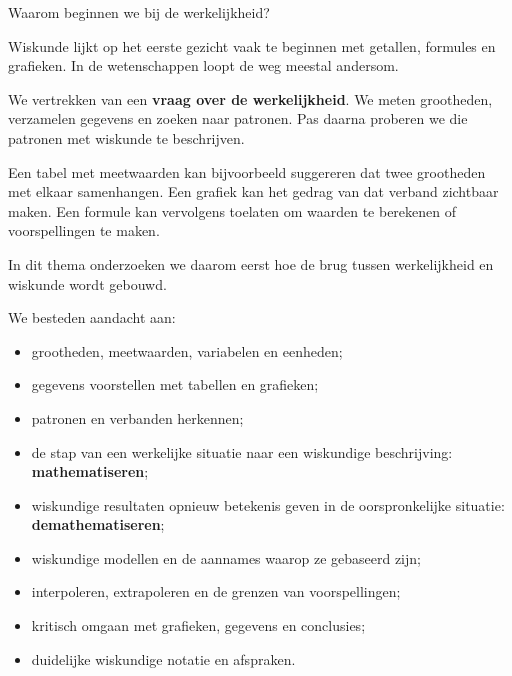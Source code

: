 \documentclass{xourse}
\begin{document}
\begin{themaintro}{Waarom beginnen we bij de werkelijkheid?}

  Wiskunde lijkt op het eerste gezicht vaak te beginnen met getallen,
  formules en grafieken. In de wetenschappen loopt de weg meestal
  andersom.

  We vertrekken van een \textbf{vraag over de werkelijkheid}.
  We meten grootheden, verzamelen gegevens en zoeken naar patronen.
  Pas daarna proberen we die patronen met wiskunde te beschrijven.

  Een tabel met meetwaarden kan bijvoorbeeld suggereren dat twee
  grootheden met elkaar samenhangen. Een grafiek kan het gedrag van
  dat verband zichtbaar maken. Een formule kan vervolgens toelaten
  om waarden te berekenen of voorspellingen te maken.

  In dit thema onderzoeken we daarom eerst hoe de brug tussen
  werkelijkheid en wiskunde wordt gebouwd.

  We besteden aandacht aan:

  \begin{itemize}

    \item grootheden, meetwaarden, variabelen en eenheden;

    \item gegevens voorstellen met tabellen en grafieken;

    \item patronen en verbanden herkennen;

    \item de stap van een werkelijke situatie naar een wiskundige
          beschrijving: \textbf{mathematiseren};

    \item wiskundige resultaten opnieuw betekenis geven in de
          oorspronkelijke situatie: \textbf{demathematiseren};

    \item wiskundige modellen en de aannames waarop ze gebaseerd zijn;

    \item interpoleren, extrapoleren en de grenzen van voorspellingen;

    \item kritisch omgaan met grafieken, gegevens en conclusies;

    \item duidelijke wiskundige notatie en afspraken.

  \end{itemize}


\end{themaintro}
\end{document}
